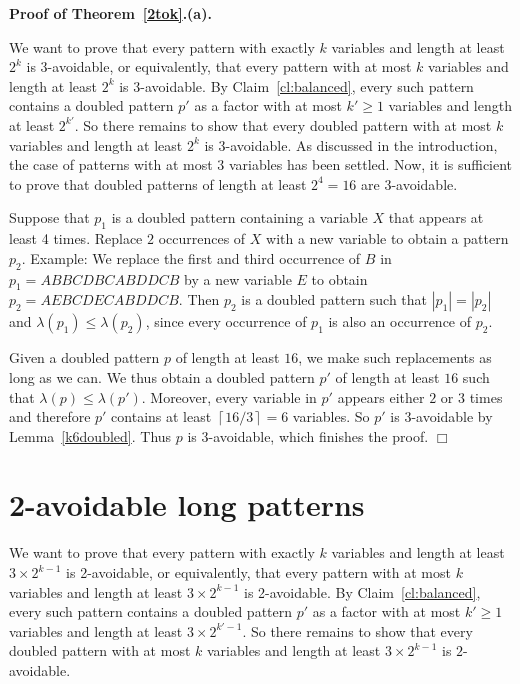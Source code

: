 \documentclass[]{elsart}
\def\ceil#1{\left\lceil #1 \right\rceil}
\newenvironment{proofof}[1]{\par \noindent \textbf{Proof of #1.}
}{\hfill$\Box$\medskip}
\begin{document}
\begin{proofof}{Theorem~\ref{2tok}.(a)}
We want to prove that every pattern with exactly $k$ variables and
length at least $2^k$ is 3-avoidable, or equivalently, that every pattern
with at most $k$ variables and length at least $2^k$ is 3-avoidable.
By Claim~\ref{cl:balanced}, every such pattern contains a doubled pattern $p'$
as a factor with at most $k'\ge 1$ variables and length at least $2^{k'}$.
So there remains to show that every doubled pattern with at most $k$
variables and length at least $2^k$ is $3$-avoidable. As discussed in
the introduction, the case of patterns with at most $3$ variables has
been settled. Now, it is sufficient to prove that doubled patterns of
length at least $2^4=16$ are 3-avoidable.

Suppose that $p_1$ is a doubled pattern containing a variable $X$ that
appears at least 4 times. Replace $2$ occurrences of $X$ with a new
variable to obtain a pattern $p_2$. Example: We replace the first and
third occurrence of $B$ in $p_1=ABBCDBCABDDCB$ by a new variable $E$ to obtain
$p_2=AEBCDECABDDCB$. Then $p_2$ is a doubled pattern such that
$|p_1|=|p_2|$ and $\lambda(p_1)\le\lambda(p_2)$, since every
occurrence of $p_1$ is also an occurrence of $p_2$.

Given a doubled pattern $p$ of length at least $16$, we make such
replacements as long as we can. We thus obtain a doubled pattern $p'$
of length at least $16$ such that $\lambda(p)\le\lambda(p')$.
Moreover, every variable in $p'$ appears either $2$ or $3$ times and
therefore $p'$ contains at least $\ceil{16/3}=6$
variables. So $p'$ is $3$-avoidable by Lemma~\ref{k6doubled}. Thus $p$ is
$3$-avoidable, which finishes the proof.
\end{proofof}

\section{2-avoidable long patterns}\label{2-a}

We want to prove that every pattern with exactly $k$ variables and
length at least $3\times 2^{k-1}$ is 2-avoidable, or equivalently,
that every pattern with at most $k$ variables and length at least
$3\times 2^{k-1}$ is 2-avoidable. By Claim~\ref{cl:balanced}, every
such pattern contains a doubled pattern $p'$ as a factor with at most
$k'\ge 1$ variables and length at least $3\times 2^{k'-1}$. So there
remains to show that every doubled pattern with at most $k$ variables
and length at least $3\times 2^{k-1}$ is $2$-avoidable.
\end{document}
